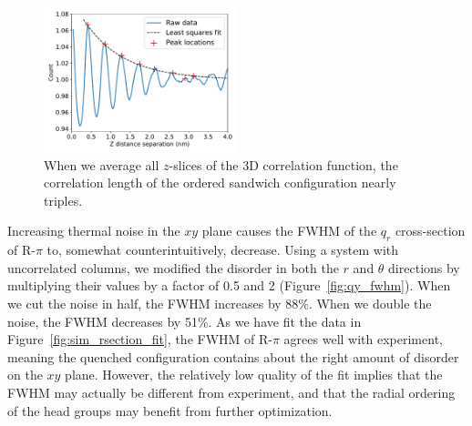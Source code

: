 \documentclass[journal=jpcbfk,manuscript=article]{achemso}
\begin{document}
  \begin{figure}
  \centering
  \includegraphics[width=0.5\textwidth]{z_correlation_fullbox.pdf}
  \caption{When we average all $z$-slices of the 3D correlation function, the 
  correlation length of the ordered sandwich configuration nearly triples.}\label{fig:z_correlation_fullbox}
  \end{figure}
 
  Increasing thermal noise in the $xy$ plane causes the FWHM of the $q_r$
  cross-section of R-$\pi$ to, somewhat counterintuitively, decrease. Using a 
  system with uncorrelated columns, we modified the disorder in both the $r$ and
  $\theta$ directions by multiplying their values by a factor of 0.5 and 2 
  (Figure~\ref{fig:qy_fwhm}). When we cut the noise in half, the FWHM increases
  by 88\%. When we double the noise, the FWHM decreases by 51\%. As we have fit
  the data in Figure~\ref{fig:sim_rsection_fit}, the FWHM of R-$\pi$ agrees
  well with experiment, meaning the quenched configuration contains about the
  right amount of disorder on the $xy$ plane. However, the relatively low quality
  of the fit implies that the FWHM may actually be different from experiment, and
  that the radial ordering of the head groups may benefit from further optimization.
\end{document}
